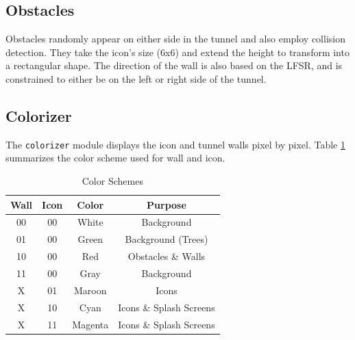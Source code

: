 \documentclass[11pt]{article}
\begin{document}
 
\subsection{Obstacles}
	Obstacles randomly appear on either side in the tunnel and also employ collision detection.  They take the icon's size (6x6) and extend the height to transform into a rectangular shape. The direction of the wall is also based on the LFSR, and is constrained to either be on the left or right side of the tunnel.
		
\subsection{Colorizer}

The \texttt{colorizer} module displays the icon and tunnel walls pixel by pixel.  Table \ref{colorizer} summarizes the color scheme used for wall and icon.
 
	\begin {table}
	\begin {center} 
	\vspace{15pt}
	
	\begin{tabular}{||c|c|c|c||}\hline	
		\textbf{Wall}	&	\textbf{Icon}	&	\textbf{Color}	&	\textbf{Purpose}		\\\hline
		00		&	00		&	White 	&	Background 	\\\hline
		01		&	00		&	Green 	&	Background (Trees) 		\\\hline
		10		&	00		&	Red 	&	Obstacles \& Walls 	\\\hline
		11		&	00		&	Gray 	&	Background	\\\hline
		X		&	01		&	Maroon	&	Icons		\\\hline
		X		&	10		&	Cyan	&	Icons \& Splash Screens	\\\hline
		X		&	11		&	Magenta	&	Icons \& Splash Screens	\\\hline	
	\end{tabular}
		\caption {Color Schemes} \label{colorizer}
	\end{center}
	\end{table} 		


%
\end{document}

